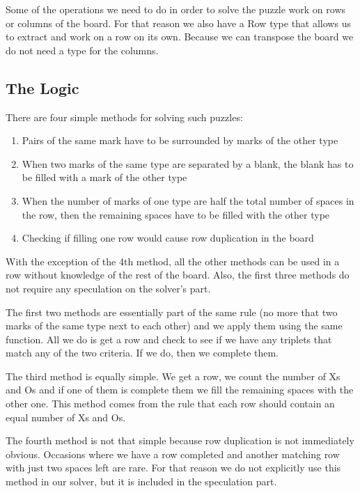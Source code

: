 \documentclass[11pt, a4paper]{scrartcl}
\begin{document}
Some of the operations we need to do in order to solve the puzzle work on rows
or columns of the board. For that reason we also have a Row type that allows us
to extract and work on a row on its own. Because we can transpose the board we
do not need a type for the columns.

\subsection{The Logic}

There are four simple methods for solving such puzzles:

\begin{enumerate}
    \item Pairs of the same mark have to be surrounded by marks of the other
        type
    \item When two marks of the same type are separated by a blank, the blank
        has to be filled with a mark of the other type
    \item When the number of marks of one type are half the total number of
        spaces in the row, then the remaining spaces have to be filled with the
        other type
    \item Checking if filling one row would cause row duplication in the board
\end{enumerate}

With the exception of the 4th method, all the other methods can be used in a row
without knowledge of the rest of the board. Also, the first three methods do not
require any speculation on the solver's part.

The first two methods are essentially part of the same rule (no more that two
marks of the same type next to each other) and we apply them using the same
function. All we do is get a row and check to see if we have any triplets that
match any of the two criteria. If we do, then we complete them.

The third method is equally simple. We get a row, we count the number of Xs and
Os and if one of them is complete them we fill the remaining spaces with the
other one. This method comes from the rule that each row should contain an equal
number of Xs and Os.

The fourth method is not that simple because row duplication is not immediately
obvious. Occasions where we have a row completed and another matching row with
just two spaces left are rare. For that reason we do not explicitly use this
method in our solver, but it is included in the speculation part.
\end{document}
